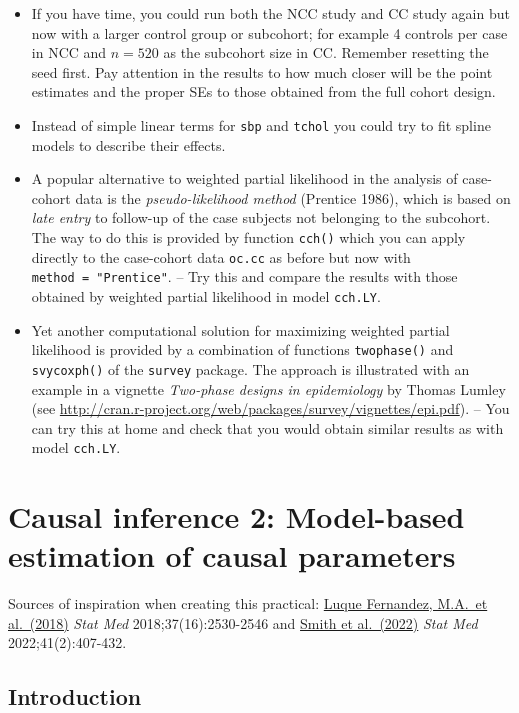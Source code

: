 \documentclass[
]{book}
\theoremstyle{definition}
\theoremstyle{definition}
\theoremstyle{definition}
\theoremstyle{definition}
\theoremstyle{remark}
\begin{document}
\begin{itemize}
\item
  If you have time, you could run both the NCC study and CC study
  again but now with a larger control group or subcohort;
  for example 4 controls per case in NCC and \(n=520\) as the subcohort size in CC.
  Remember resetting the seed first.
  Pay attention in the results to how much closer
  will be the point estimates and the proper SEs to those
  obtained from the full cohort design.
\item
  Instead of simple linear terms for \texttt{sbp} and \texttt{tchol} you could try to fit
  spline models to describe their effects.
\item
  A popular alternative to weighted partial likelihood
  in the analysis of case-cohort data is the \emph{pseudo-likelihood method}
  (Prentice 1986), which is based on \emph{late entry} to follow-up
  of the case subjects not belonging to
  the subcohort.
  The way to do this is provided by function \texttt{cch()} which
  you can apply directly to the case-cohort data \texttt{oc.cc} as before
  but now with \texttt{method\ =\ "Prentice"}. -- Try this and compare the results
  with those obtained by weighted partial likelihood in model
  \texttt{cch.LY}.
\item
  Yet another computational solution for
  maximizing weighted partial likelihood is provided by
  a combination of functions \texttt{twophase()}
  and \texttt{svycoxph()} of the \texttt{survey} package.
  The approach is illustrated with an example
  in a vignette \emph{Two-phase designs in epidemiology} by Thomas Lumley
  (see \url{http://cran.r-project.org/web/packages/survey/vignettes/epi.pdf}).
  -- You can try this at home and check that you would obtain similar results as
  with model \texttt{cch.LY}.
\end{itemize}

\chapter{Causal inference 2: Model-based estimation of causal parameters}\label{causal-inference-2-model-based-estimation-of-causal-parameters}

Sources of inspiration when creating this practical:
\href{https://doi.org/10.1002/sim.7628}{Luque Fernandez, M.A.~et al.~(2018)}
\emph{Stat Med}
2018;37(16):2530-2546 and
\href{https://doi.org/10.1002/sim.9234}{Smith et al.~(2022)} \emph{Stat Med}
2022;41(2):407-432.

\section{Introduction}\label{introduction-3}
\end{document}
